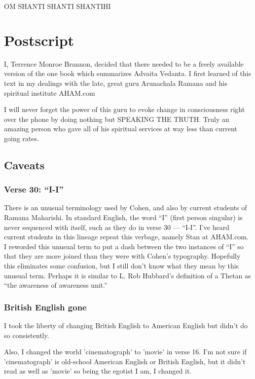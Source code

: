 \documentclass[12pt]{report}
\begin{document}
OM SHANTI SHANTI SHANTIHI



\printindex

\chapter{Postscript}

I, Terrence Monroe Brannon, decided that there needed to be a freely
available version of the one book which summarizes Advaita Vedanta. I
first learned of this text in my dealings with the late, great
guru Arunachala Ramana and his spiritual institute AHAM.com

I will never forget the power of this guru to evoke change in
consciousness right over the phone by doing nothing but SPEAKING THE
TRUTH. Truly an amazing person who gave all of his spiritual services
at way less than current going rates.

\section{Caveats}

\subsection{Verse 30: ``I-I''}

There is an unusual terminology used by Cohen, and also by current
students of Ramana Maharishi. In standard English, the word ``I''
(first person singular) is never sequenced with itself, such as they
do in verse 30 --- ``I-I''. I've heard current students in this
lineage repeat this verbage, namely Stan at AHAM.com. I reworded this
unusual term to put a dash between the two instances of ``I'' so that
they are more joined than they were with Cohen's typography. Hopefully
this eliminates some confusion, but I still don't know what they mean
by this unusual term. Perhaps it is similar to L. Rob Hubbard's
definition of a Thetan as ``the awareness of awareness unit.''

\subsection{British English gone}

I took the liberty of changing British English to American
English but didn't do so consistently. 

Also, I changed the world 'cinematograph' to 'movie' in verse 16. I'm
not sure if 'cinematograph' is old-school American English or British
English, but it didn't read as well as 'movie' so being the egotist I
am, I changed it.
\end{document}

